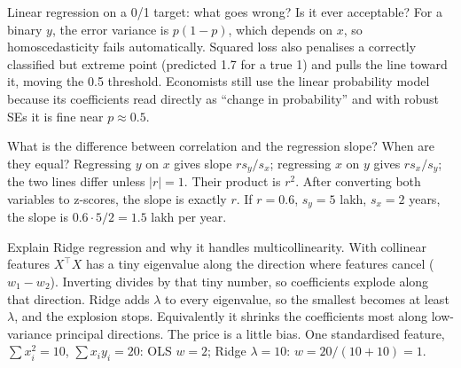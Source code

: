 \begin{qa}{\deep Linear regression on a 0/1 target: what goes wrong? Is it ever acceptable?}
\why For a binary $y$, the error variance is $p(1-p)$, which depends on $x$, so homoscedasticity fails automatically.
Squared loss also penalises a correctly classified but extreme point (predicted 1.7 for a true 1) and pulls the line
toward it, moving the 0.5 threshold. Economists still use the linear probability model because its coefficients read
directly as ``change in probability'' and with robust SEs it is fine near $p\approx0.5$.
\end{qa}

\begin{qa}{What is the difference between correlation and the regression slope? When are they equal?}
\why Regressing $y$ on $x$ gives slope $r s_y/s_x$; regressing $x$ on $y$ gives $r s_x/s_y$; the two lines differ
unless $|r| = 1$. Their product is $r^2$. After converting both variables to z-scores, the slope is exactly $r$.
\worked If $r = 0.6$, $s_y = 5$ lakh, $s_x = 2$ years, the slope is $0.6\cdot5/2 = 1.5$ lakh per year.
\end{qa}

\begin{qa}{Explain Ridge regression and why it handles multicollinearity.}
\why With collinear features $X^\top X$ has a tiny eigenvalue along the direction where features cancel ($w_1 -
w_2$). Inverting divides by that tiny number, so coefficients explode along that direction. Ridge adds $\lambda$ to
every eigenvalue, so the smallest becomes at least $\lambda$, and the explosion stops. Equivalently it shrinks the
coefficients most along low-variance principal directions. The price is a little bias.
\worked One standardised feature, $\sum x_i^2 = 10$, $\sum x_iy_i = 20$: OLS $w = 2$; Ridge $\lambda = 10$: $w =
20/(10+10) = 1$.
\end{qa}

